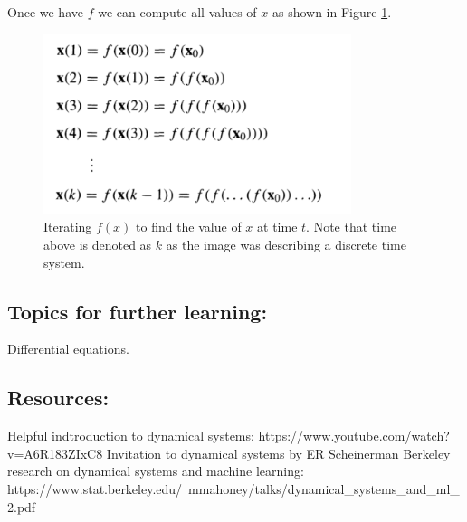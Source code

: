 \documentclass{article}
\begin{document}
Once we have $f$ we can compute all values of $x$ as shown in Figure \ref{fig:dynamical_systems_iteration}.
\begin{figure}[H]
    \centering
    \includegraphics[width=90mm]{images/dynamical_systems_iteration.png}
    \caption{Iterating $f(x)$ to find the value of $x$ at time $t$. Note that time above is denoted as $k$ as the image was describing a discrete time system.}
    \label{fig:dynamical_systems_iteration}
\end{figure}



\subsection{Topics for further learning:}
Differential equations.

\subsection{Resources:}
Helpful indtroduction to dynamical systems: https://www.youtube.com/watch?v=A6R183ZIxC8
Invitation to dynamical systems by ER Scheinerman
Berkeley research on dynamical systems and machine learning: https://www.stat.berkeley.edu/~mmahoney/talks/dynamical_systems_and_ml_2.pdf
\end{document}
